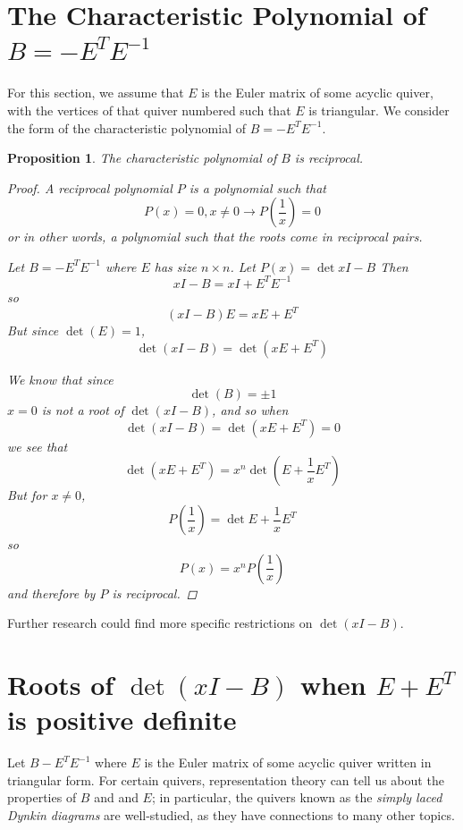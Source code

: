 \documentclass{amsart}
\theoremstyle{theorem}
\theoremstyle{theorem*}
\newtheorem{proposition}[theorem]{Proposition}
\theoremstyle{definition}
\begin{document}
\section{The Characteristic Polynomial of $B = -E^T E^{-1}$}

For this section, we assume that $E$ is the Euler matrix of some acyclic quiver,
with the vertices of that quiver numbered such that $E$ is triangular. We consider
the form of the characteristic polynomial of $B = - E^T E^{-1}$.

\begin{proposition}
    The characteristic polynomial of $B$ is reciprocal.
    \begin{proof}
        A \textit{reciprocal polynomial} $P$ is a polynomial such that
        $$P(x) = 0, x \neq 0 \rightarrow P(\frac{1}{x}) = 0$$
        or in other words, a polynomial such that the roots come in reciprocal pairs.

        Let $B = - E^T E^{-1}$ where $E$ has size $n \times n$. Let $P(x) = \det{xI - B}$
        Then 
        $$xI - B = xI + E^T E^{-1}$$
        so 
        $$(xI - B)E = xE + E^T$$
        But since $\det(E) = 1$,
        $$\det(xI - B) = \det(xE + E^T)$$

        We know that since
        $$\det(B) = \pm 1$$
        $x = 0$ is not a root of $\det(xI - B)$,
        and so when
        $$\det(xI - B) = \det(xE + E^T) = 0$$
        we see that 
        $$\det(xE+E^T) = x^n \det(E + \frac{1}{x} E^T)$$
        But for $x \neq 0$,
        $$P(\frac{1}{x}) = \det{E + \frac{1}{x} E^T}$$
        so
        $$P(x) = x^n P(\frac{1}{x})$$
        and therefore by \cite{syz}  $P$ is reciprocal.
    \end{proof}
\end{proposition}

Further research could find more specific restrictions on $\det(xI - B)$.

\section{Roots of $\det(xI - B)$ when $E + E^T$ is positive definite}

Let $B - E^T E^{-1}$ where $E$ is the Euler matrix of some acyclic quiver written
in triangular form. For certain quivers, representation theory can tell us
about the properties of $B$ and and $E$; in particular, the quivers known as
the \textit{simply laced Dynkin diagrams} are well-studied, as they have connections
to many other topics. 
\end{document}
